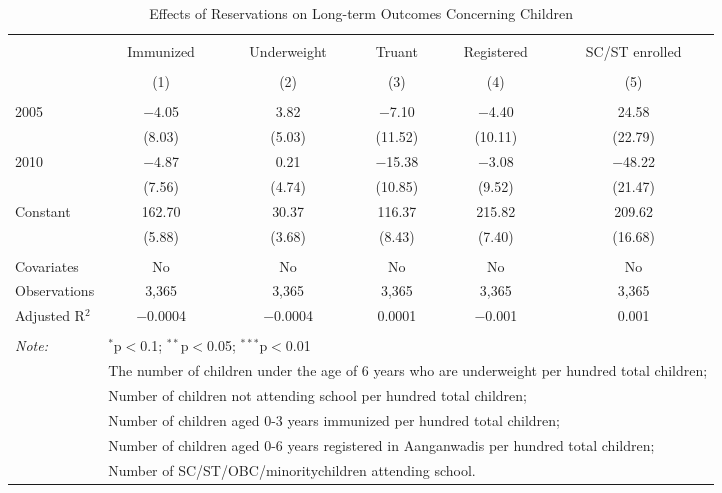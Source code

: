 
\begin{table}[!htbp] \centering 
  \caption{Effects of Reservations on Long-term Outcomes Concerning Children} 
  \label{raj_shrug_children_05_10} 
\scriptsize 
\begin{tabular}{@{\extracolsep{5pt}}lccccc} 
\\[-1.8ex]\hline 
\hline \\[-1.8ex] 
 & Immunized & Underweight & Truant & Registered & SC/ST enrolled \\ 
\\[-1.8ex] & (1) & (2) & (3) & (4) & (5)\\ 
\hline \\[-1.8ex] 
 2005 & $-$4.05 & 3.82 & $-$7.10 & $-$4.40 & 24.58 \\ 
  & (8.03) & (5.03) & (11.52) & (10.11) & (22.79) \\ 
  2010 & $-$4.87 & 0.21 & $-$15.38 & $-$3.08 & $-$48.22 \\ 
  & (7.56) & (4.74) & (10.85) & (9.52) & (21.47) \\ 
  Constant & 162.70 & 30.37 & 116.37 & 215.82 & 209.62 \\ 
  & (5.88) & (3.68) & (8.43) & (7.40) & (16.68) \\ 
 \hline \\[-1.8ex] 
Covariates & No & No & No & No & No \\ 
Observations & 3,365 & 3,365 & 3,365 & 3,365 & 3,365 \\ 
Adjusted R$^{2}$ & $-$0.0004 & $-$0.0004 & 0.0001 & $-$0.001 & 0.001 \\ 
\hline 
\hline \\[-1.8ex] 
\textit{Note:}  & \multicolumn{5}{l}{$^{*}$p$<$0.1; $^{**}$p$<$0.05; $^{***}$p$<$0.01} \\ 
 & \multicolumn{5}{l}{The number of children under the age of 6 years who are underweight per hundred total children;} \\ 
 & \multicolumn{5}{l}{Number of children not attending school per hundred total children;} \\ 
 & \multicolumn{5}{l}{Number of children aged 0-3 years immunized per hundred total children;} \\ 
 & \multicolumn{5}{l}{Number of children aged 0-6 years registered in Aanganwadis per hundred total children;} \\ 
 & \multicolumn{5}{l}{Number of SC/ST/OBC/minoritychildren attending school.} \\ 
\end{tabular} 
\end{table} 
